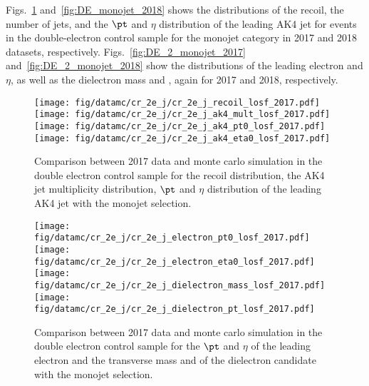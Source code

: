 Figs.~\ref{fig:DE_monojet_2017} and~\ref{fig:DE_monojet_2018} shows the distributions of the recoil, the number of jets, and the $\pt$ and $\eta$ distribution of the leading AK4  jet
for events in the double-electron control sample for the monojet category in 2017 and 2018 datasets, respectively. Figs.~\ref{fig:DE_2_monojet_2017} and~\ref{fig:DE_2_monojet_2018} show the distributions of the leading electron \pt and $\eta$, as well as the dielectron mass and \pt, again for 2017 and 2018, respectively.

\begin{figure}[htbp]
    \begin{center}
        \texttt{[image: fig/datamc/cr\_2e\_j/cr\_2e\_j\_recoil\_losf\_2017.pdf]}
        \texttt{[image: fig/datamc/cr\_2e\_j/cr\_2e\_j\_ak4\_mult\_losf\_2017.pdf]} \\
        \texttt{[image: fig/datamc/cr\_2e\_j/cr\_2e\_j\_ak4\_pt0\_losf\_2017.pdf]}
        \texttt{[image: fig/datamc/cr\_2e\_j/cr\_2e\_j\_ak4\_eta0\_losf\_2017.pdf]}
    \end{center}
    \caption{Comparison between 2017 data and monte carlo simulation in the double electron control sample for
        the recoil distribution, the AK4 jet multiplicity distribution,  $\pt$ and $\eta$ distribution
        of the leading AK4  jet with the monojet selection.}
    \label{fig:DE_monojet_2017}
\end{figure}

\begin{figure}[htbp]
    \begin{center}
        \texttt{[image: fig/datamc/cr\_2e\_j/cr\_2e\_j\_electron\_pt0\_losf\_2017.pdf]}
        \texttt{[image: fig/datamc/cr\_2e\_j/cr\_2e\_j\_electron\_eta0\_losf\_2017.pdf]} \\
        \texttt{[image: fig/datamc/cr\_2e\_j/cr\_2e\_j\_dielectron\_mass\_losf\_2017.pdf]}
        \texttt{[image: fig/datamc/cr\_2e\_j/cr\_2e\_j\_dielectron\_pt\_losf\_2017.pdf]}
    \end{center}
    \caption{Comparison between 2017 data and monte carlo simulation in the double electron control sample for
        the $\pt$ and $\eta$ of the leading electron and the transverse mass and \pt of the dielectron candidate with the monojet selection.}
    \label{fig:DE2_monojet_2017}
\end{figure}

